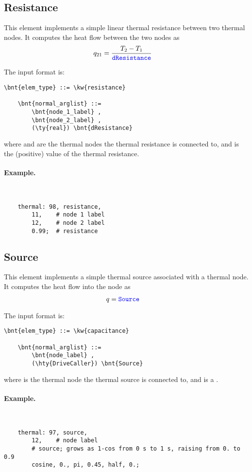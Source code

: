 \subsection{Resistance}
\label{sec:EL:THERMO:RESISTANCE}

This element implements a simple linear thermal resistance between two thermal nodes.
It computes the heat flow between the two nodes as
\begin{align*}
	q_{21} &= \frac{T_2 - T_1}{\textcolor{blue}{\texttt{dResistance}}}
\end{align*}

The input format is:
\begin{Verbatim}[commandchars=\\\{\}]
    \bnt{elem_type} ::= \kw{resistance}

    \bnt{normal_arglist} ::= 
        \bnt{node_1_label} , 
        \bnt{node_2_label} , 
        (\ty{real}) \bnt{dResistance}
\end{Verbatim}
where  and  are the thermal nodes the thermal resistance is connected to, and  is the (positive) value of the thermal resistance.

\paragraph{Example.} \
\begin{verbatim}
    thermal: 98, resistance,
        11,    # node 1 label
        12,    # node 2 label
        0.99;  # resistance
\end{verbatim}



\subsection{Source}
\label{sec:EL:THERMO:SOURCE}

This element implements a simple thermal source associated with a thermal node.
It computes the heat flow into the node as
\begin{align*}
	q &= \textcolor{blue}{\texttt{Source}}
\end{align*}

The input format is:
\begin{Verbatim}[commandchars=\\\{\}]
    \bnt{elem_type} ::= \kw{capacitance}

    \bnt{normal_arglist} ::= 
        \bnt{node_label} , 
        (\hty{DriveCaller}) \bnt{Source}
\end{Verbatim}
where  is the thermal node the thermal source is connected to, and  is a .

\paragraph{Example.} \
\begin{verbatim}
    thermal: 97, source,
        12,    # node label
        # source; grows as 1-cos from 0 s to 1 s, raising from 0. to 0.9 
        cosine, 0., pi, 0.45, half, 0.;
\end{verbatim}





